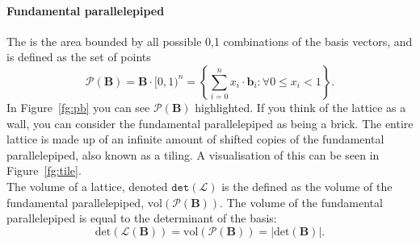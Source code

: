 \paragraph{Fundamental parallelepiped} The  is the area bounded by all possible 0,1 combinations of the basis vectors, and is defined as the set of points $$\mathcal{P}(\textbf{B}) = \textbf{B}\cdot[0,1)^{n} = \left\{ \sum_{i=0}^{n} x_{i}\cdot\textbf{b}_{i}:\forall 0 \le x_{i} < 1 \right\}.$$
In Figure~\ref{fg:pb} you can see $\mathcal{P}(\textbf{B})$ highlighted.
If you think of the lattice as a wall, you can consider the fundamental parallelepiped as being a brick. The entire lattice is made up of an infinite amount of shifted copies of the fundamental parallelepiped, also known as a tiling. A visualisation of this can be seen in Figure~\ref{fg:tile}.
\\
The volume of a lattice, denoted $\mathtt{det}(\mathcal{L})$ is the defined as the volume of the fundamental parallelepiped, $\text{vol}(\mathcal{P}(\textbf{B}))$.
The volume of the fundamental parallelepiped is equal to the determinant of the basis:
$$\text{det}(\mathcal{L}(\textbf{B})) = \text{vol}(\mathcal{P}(\textbf{B})) = |\text{det}(\textbf{B})|. $$

